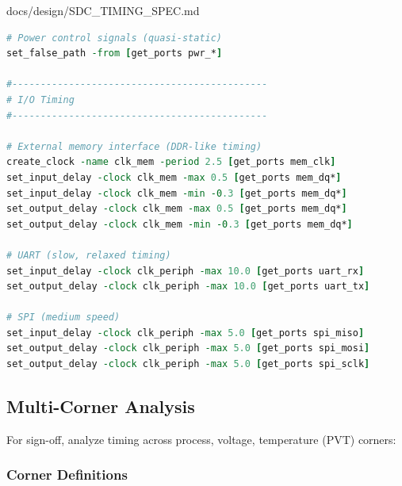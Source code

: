\begin{relocated}{docs/design/SDC_TIMING_SPEC.md}
\begin{lstlisting}[language=tcl]
# Power control signals (quasi-static)
set_false_path -from [get_ports pwr_*]

#---------------------------------------------
# I/O Timing
#---------------------------------------------

# External memory interface (DDR-like timing)
create_clock -name clk_mem -period 2.5 [get_ports mem_clk]
set_input_delay -clock clk_mem -max 0.5 [get_ports mem_dq*]
set_input_delay -clock clk_mem -min -0.3 [get_ports mem_dq*]
set_output_delay -clock clk_mem -max 0.5 [get_ports mem_dq*]
set_output_delay -clock clk_mem -min -0.3 [get_ports mem_dq*]

# UART (slow, relaxed timing)
set_input_delay -clock clk_periph -max 10.0 [get_ports uart_rx]
set_output_delay -clock clk_periph -max 10.0 [get_ports uart_tx]

# SPI (medium speed)
set_input_delay -clock clk_periph -max 5.0 [get_ports spi_miso]
set_output_delay -clock clk_periph -max 5.0 [get_ports spi_mosi]
set_output_delay -clock clk_periph -max 5.0 [get_ports spi_sclk]
\end{lstlisting}

\subsection{Multi-Corner Analysis}\label{ds:ch:sdc-timing-spec:multi-corner-analysis}

For sign-off, analyze timing across process, voltage, temperature (PVT)
corners:

\subsubsection{Corner Definitions}\label{ds:ch:sdc-timing-spec:corner-definitions}


\end{relocated}

